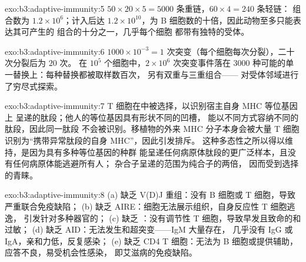 \begin{solution}{exo:b3:adaptive-immunity:5}
$50\times 20\times 5 = 5000$ 条重链，$60\times 4 = 240$ 条轻链：
组合数为 $1.2\times 10^{6}$；计入后达 $1.2\times
10^{10}$，为 B 细胞数的十倍，因此动物至多只能表达其可产生的
组合的十分之一，几乎每个细胞
都带有独特的受体。
\end{solution}

\begin{solution}{exo:b3:adaptive-immunity:6}
$1000\times 10^{-3} = 1$ 次突变（每个细胞每次分裂），二十次分裂后为 $20$ 次。
在 $10^{5}$ 个细胞中，$2\times 10^{6}$ 次突变事件落在
$3000$ 种可能的单一替换上：每种替换都被取样数百次，
另有双重与三重组合——
对受体邻域进行了穷尽式探索。
\end{solution}

\begin{solution}{exo:b3:adaptive-immunity:7}
T 细胞在中被选择，以识别宿主自身 MHC 等位基因上
呈递的肽段；他人的等位基因具有形状不同的凹槽，
能以不同方式容纳不同的肽段，因此同一肽段
不会被识别。移植物的外来 MHC 分子本身会被大量
T 细胞识别为“携带异常肽段的自身 MHC”，因此引发排斥。
这种多态性之所以得以维持，是因为具有多种等位基因的种群
能呈递任何病原体肽段的更广泛样本，且没有任何病原体能逃避所有人；
杂合子呈递的范围为纯合子的两倍，
因而受到选择的青睐。
\end{solution}

\begin{solution}{exo:b3:adaptive-immunity:8}
(a) 缺乏 V(D)J 重组：没有 B 细胞或 T 细胞，导致严重联合免疫缺陷；
(b) 缺乏 AIRE：细胞无法展示组织，自身反应性 T 细胞逃逸，
引发针对多种器官的；
(c) 缺乏 ：没有调节性 T 细胞，导致早发且致命的和过敏；
(d) 缺乏 AID：无法发生和超突变——IgM 大量存在，
几乎没有 IgG 或 IgA，亲和力低，反复感染；
(e) 缺乏 CD4 T 细胞：无法为 B 细胞或提供辅助，
应答不良，易受机会性感染，
即艾滋病的免疫缺陷。
\end{solution}

